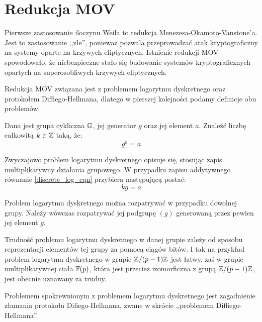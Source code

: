 \section{Redukcja MOV}

\noindent
Pierwsze zastosowanie iloczynu Weila
to redukcja Menezesa-Okamoto-Vanstone'a.
Jest to zastosowanie ,,złe'',
ponieważ pozwala przeprowadzać atak kryptograficzny
na systemy oparte na krzywych eliptycznych.
Istnienie redukcji MOV spowodowało,
że niebezpieczne stało się budowanie systemów kryptograficznych
opartych na superosobliwych krzywych eliptycznych.

\noindent
Redukcja MOV związana jest
z problemem logarytmu dyskretnego oraz protokołem Diff\-iego-Hell\-mana,
dlatego w pierszej kolejności podamy definicje obu problemów.

\begin{problem}
Dana jest grupa cykliczna $\mathbb{G}$,
jej generator $g$
oraz jej element $a$.
Znaleźć liczbę całkowitą $k \in \mathbb{Z}$ taką, że:
\begin{equation}\label{discrete_log_eqn}
g^k = a
\end{equation}
\end{problem}

\begin{remark}
Zwyczajowo problem logarytmu dyskretnego opisuje się,
stosując zapis multiplikatywny działania grupowego.
W przypadku zapisu addytywnego równanie \ref{discrete_log_eqn}
przybiera następującą postać:
\begin{equation}\label{discrete_log_additive_eqn}
kg = a
\end{equation}
\end{remark}

\begin{remark}
Problem logarytmu dyskretnego można rozpatrywać w przypadku dowolnej grupy.
Należy wówczas rozpatrywać jej podgrupę $(g)$
generowaną przez pewien jej element $g$.
\end{remark}

\begin{remark}
Trudność problemu logarytmu dyskretnego w danej grupie
zależy od sposobu reprezentacji elementów tej grupy
za pomocą ciągów bitów.
I tak na przykład problem logarytmu dyskretnego w grupie $\mathbb{Z} / (p-1)\mathbb{Z}$
jest łatwy,
zaś w grupie multiplikatywnej ciała $\mathbb{F}(p)$,
która jest przecież izomorficzna z grupą $\mathbb{Z} / (p-1)\mathbb{Z}$,
jest obecnie uznawany za trudny.
\end{remark}

\noindent
Problemem spokrewnionym z problemem logarytmu dyskretnego
jest zagadnienie złamania protokołu Difiego-Hellmana,
zwane w skrócie ,,problemem Diffiego-Hellmana''.

